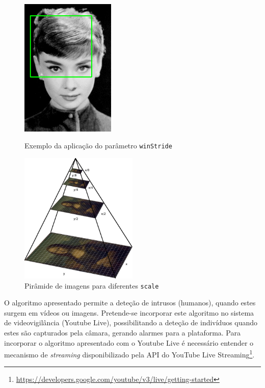 \begin{figure}[h]
	\centering
	\begin{minipage}[b]{0.49\textwidth}
		\centering
		\includegraphics[width=0.4\textwidth]{img/sliding_window_example-11.png}
		\caption{Exemplo da aplicação do parâmetro \texttt{winStride} }
		\label{winStride}
	\end{minipage}
	\hfill
	\begin{minipage}[b]{0.49\textwidth}
		\centering
		\includegraphics[width=0.5\textwidth]{img/pyramid.png}
		\caption{Pirâmide de imagens para diferentes \texttt{scale}}
		\label{scale}
	\end{minipage}
	
\end{figure}




O algoritmo apresentado permite a deteção de intrusos (humanos), quando estes surgem em vídeos ou imagens. Pretende-se incorporar este algoritmo no sistema de videovigilância (Youtube Live), possibilitando a deteção de indivíduos quando estes são capturados pela câmara, gerando alarmes para a plataforma. Para incorporar o algoritmo apresentado com o Youtube Live é necessário entender o mecanismo de \textit{streaming} disponibilizado pela \ac{API} do YouTube Live Streaming\footnote{\url{https://developers.google.com/youtube/v3/live/getting-started}}.  


